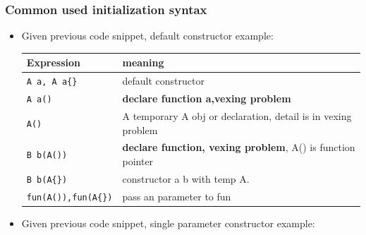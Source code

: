 \documentclass[a4paper,11pt,twoside]{book}
\newcommand{\tophline}{\hline }
\newcommand{\bottomhline}{\\ \hline }
\newcommand{\tophline}{ }
\newcommand{\bottomhline}{ }
\begin{document}
\subsubsection{Common used initialization syntax}
\begin{itemize}
\begin{lstlisting}[frame=single, language=c++]
class A{
	public:
	A(){};
	A(int k):m_a(k){};
	A(const A& rhs){m_a = rhs.m_a;};
	int m_a;
};
void fun(const A &a){}
int i = 3;	
\end{lstlisting}	
	
	\item Given previous code snippet, default constructor example:\\ 
	\begin{tabular}{|p{}|p{}|}
		\tophline
		Expression & meaning \\
		\tophline
		\texttt{A a, A a\{\}} & default constructor \\
		\tophline
		\texttt{A a()} & \textbf{declare function a,vexing problem} \\
		\tophline
		\texttt{A()} & A temporary A obj or declaration, detail is in vexing problem \\
		\tophline
		\texttt{B b(A())} & \textbf{declare function, vexing problem}, A() is function pointer \\
		\tophline
		\texttt{B b(A\{\})} & constructor a b with temp A. \\
		\tophline
		\texttt{fun(A()),fun(A\{\})} & pass an parameter to fun
		\bottomhline
	\end{tabular}

	\item Given previous code snippet, single parameter constructor example: \\ 
	

\end{itemize}
\end{document}
